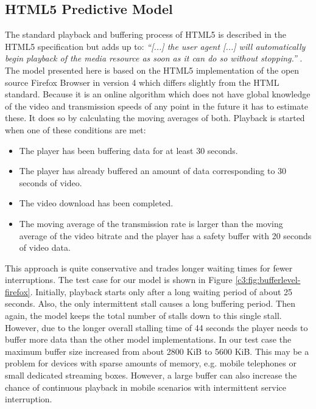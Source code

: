 \subsection{HTML5 Predictive Model}
The standard playback and buffering process of HTML5 is described in the HTML5 specification but adds up to:
\textit{``[...] the user agent [...] will automatically begin playback of the media resource as soon as it can do so without stopping.''} \cite{html5video}. The model presented here is based on the HTML5 implementation of the open source Firefox Browser in version 4 which differs slightly from the HTML standard. Because it is an online algorithm which does not have global knowledge of the video and transmission speeds of any point in the future it has to estimate these. It does so by calculating the moving averages of both. Playback is started when one of these conditions are met:

\begin{itemize}
\item The player has been buffering data for at least 30 seconds.
\item The player has already buffered an amount of data corresponding to 30 seconds of video.
\item The video download has been completed.
\item The moving average of the transmission rate is larger than the moving average of the video bitrate and the player has a safety buffer with 20 seconds of video data.
\end{itemize}

This approach is quite conservative and trades longer waiting times for fewer interruptions. The test case for our model is shown in Figure \ref{c3:fig:bufferlevel-firefox}. Initially, playback starts only after a long waiting period of about 25 seconds. Also, the only intermittent stall causes a long buffering period. Then again, the model keeps the total number of stalls down to this single stall. However, due to the longer overall stalling time of 44 seconds the player needs to buffer more data than the other model implementations. In our test case the maximum buffer size increased from about 2800 KiB to 5600 KiB. This may be a problem for devices with sparse amounts of memory, e.g. mobile telephones or small dedicated streaming boxes. However, a large buffer can also increase the chance of continuous playback in mobile scenarios with intermittent service interruption.




